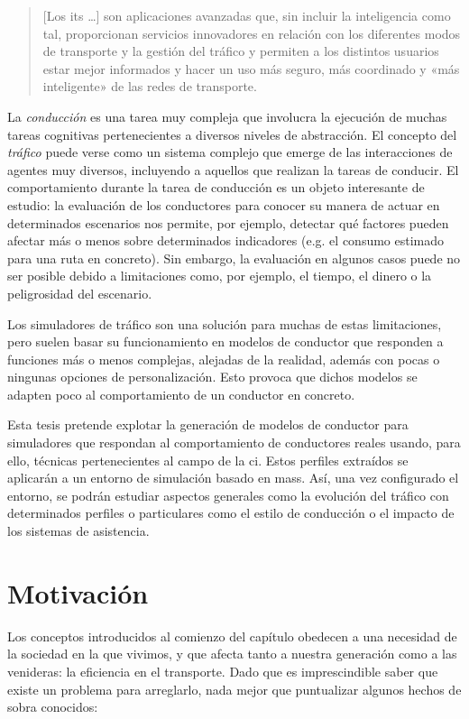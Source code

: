 \blockquote{[Los \ac{its} \ldots] son aplicaciones avanzadas que, sin incluir la inteligencia como tal, proporcionan servicios innovadores en relación con los diferentes modos de transporte y la gestión del tráfico y permiten a los distintos usuarios estar mejor informados y hacer un uso más seguro, más coordinado y «más inteligente» de las redes de transporte.}

La \textit{conducción} es una tarea muy compleja que involucra la ejecución de muchas tareas cognitivas pertenecientes a diversos niveles de abstracción. El concepto del \textit{tráfico} puede verse como un sistema complejo que emerge de las interacciones de agentes muy diversos, incluyendo a aquellos que realizan la tareas de conducir. El comportamiento durante la tarea de conducción es un objeto interesante de estudio: la evaluación de los conductores para conocer su manera de actuar en determinados escenarios nos permite, por ejemplo, detectar qué factores pueden afectar más o menos sobre determinados indicadores (e.g. el consumo estimado para una ruta en concreto). Sin embargo, la evaluación en algunos casos puede no ser posible debido a limitaciones como, por ejemplo, el tiempo, el dinero o la peligrosidad del escenario.

Los simuladores de tráfico son una solución para muchas de estas limitaciones, pero suelen basar su funcionamiento en modelos de conductor que responden a funciones más o menos complejas, alejadas de la realidad, además con pocas o ningunas opciones de personalización. Esto provoca que dichos modelos se adapten poco al comportamiento de un conductor en concreto.

Esta tesis pretende explotar la generación de modelos de conductor para simuladores que respondan al comportamiento de conductores reales usando, para ello, técnicas pertenecientes al campo de la \ac{ci}. Estos perfiles extraídos se aplicarán a un entorno de simulación basado en \acp{mas}. Así, una vez configurado el entorno, se podrán estudiar aspectos generales como la evolución del tráfico con determinados perfiles o particulares como el estilo de conducción o el impacto de los sistemas de asistencia.

\section{Motivación}

Los conceptos introducidos al comienzo del capítulo obedecen a una necesidad de la sociedad en la que vivimos, y que afecta tanto a nuestra generación como a las venideras: la eficiencia en el transporte. Dado que es imprescindible saber que existe un problema para arreglarlo, nada mejor que puntualizar algunos hechos de sobra conocidos:

